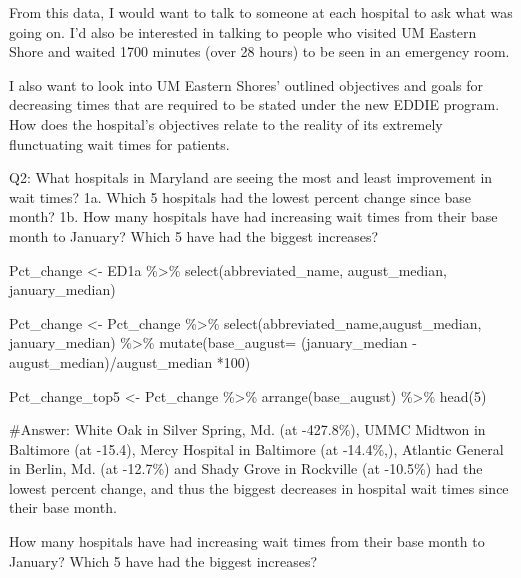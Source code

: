 \documentclass[
  letterpaper,
  DIV=11,
  numbers=noendperiod]{scrartcl}
\newenvironment{Shaded}{\begin{snugshade}}{\end{snugshade}}
\newcommand{\AttributeTok}[1]{\textcolor[rgb]{0.40,0.45,0.13}{#1}}
\newcommand{\CommentTok}[1]{\textcolor[rgb]{0.37,0.37,0.37}{#1}}
\newcommand{\DecValTok}[1]{\textcolor[rgb]{0.68,0.00,0.00}{#1}}
\newcommand{\FunctionTok}[1]{\textcolor[rgb]{0.28,0.35,0.67}{#1}}
\newcommand{\NormalTok}[1]{\textcolor[rgb]{0.00,0.23,0.31}{#1}}
\newcommand{\OtherTok}[1]{\textcolor[rgb]{0.00,0.23,0.31}{#1}}
\newcommand{\SpecialCharTok}[1]{\textcolor[rgb]{0.37,0.37,0.37}{#1}}
\begin{document}
From this data, I would want to talk to someone at each hospital to ask
what was going on. I'd also be interested in talking to people who
visited UM Eastern Shore and waited 1700 minutes (over 28 hours) to be
seen in an emergency room.

I also want to look into UM Eastern Shores' outlined objectives and
goals for decreasing times that are required to be stated under the new
EDDIE program. How does the hospital's objectives relate to the reality
of its extremely flunctuating wait times for patients.

Q2: What hospitals in Maryland are seeing the most and least improvement
in wait times? 1a. Which 5 hospitals had the lowest percent change since
base month? 1b. How many hospitals have had increasing wait times from
their base month to January? Which 5 have had the biggest increases?

\begin{Shaded}
\begin{Highlighting}[]
\NormalTok{Pct\_change }\OtherTok{\textless{}{-}}\NormalTok{ ED1a }\SpecialCharTok{\%\textgreater{}\%} 
  \FunctionTok{select}\NormalTok{(abbreviated\_name, august\_median, january\_median) }

\NormalTok{Pct\_change }\OtherTok{\textless{}{-}}\NormalTok{ Pct\_change }\SpecialCharTok{\%\textgreater{}\%}
  \FunctionTok{select}\NormalTok{(abbreviated\_name,august\_median, january\_median) }\SpecialCharTok{\%\textgreater{}\%} 
    \FunctionTok{mutate}\NormalTok{(}\AttributeTok{base\_august=}\NormalTok{ (january\_median }\SpecialCharTok{{-}}\NormalTok{ august\_median)}\SpecialCharTok{/}\NormalTok{august\_median }\SpecialCharTok{*}\DecValTok{100}\NormalTok{) }


\NormalTok{Pct\_change\_top5 }\OtherTok{\textless{}{-}}\NormalTok{ Pct\_change }\SpecialCharTok{\%\textgreater{}\%} 
  \FunctionTok{arrange}\NormalTok{(base\_august) }\SpecialCharTok{\%\textgreater{}\%} 
  \FunctionTok{head}\NormalTok{(}\DecValTok{5}\NormalTok{)}

\CommentTok{\#Answer: White Oak in Silver Spring, Md. (at {-}427.8\%), UMMC Midtwon in Baltimore (at {-}15.4), Mercy Hospital in Baltimore (at {-}14.4\%,), Atlantic General in Berlin, Md. (at {-}12.7\%) and Shady Grove in Rockville (at {-}10.5\%) had the lowest percent change, and thus the biggest decreases in hospital wait times since their base month.}
\end{Highlighting}
\end{Shaded}

How many hospitals have had increasing wait times from their base month
to January? Which 5 have had the biggest increases?
\end{document}
